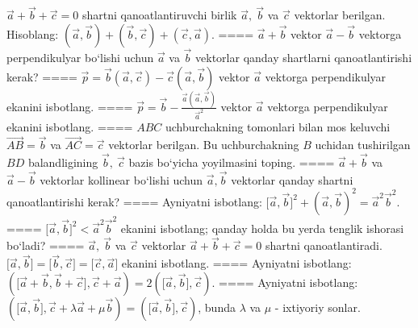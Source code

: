 \(\vec{a} + \vec{b} + \vec{c} = 0\) shartni qanoatlantiruvchi birlik \(\vec{a},\ \vec{b}\) va \(\vec{c}\) vektorlar berilgan. Hisoblang: \(\left(\vec{a},\vec{b} \right) + \left(\vec{b},\vec{c} \right) + \left(\vec{c},\vec{a} \right) \).
====
\(\vec{a} + \vec{b}\) vektor \(\vec{a} - \vec{b}\) vektorga perpendikulyar bo‘lishi uchun \(\vec{a}\) va \(\vec{b}\) vektorlar qanday shartlarni qanoatlantirishi kerak?
====
\(\vec{p} = \vec{b} (\vec{a},\vec{c}) - \vec{c} (\vec{a},\vec{b}) \) vektor \(\vec{a}\) vektorga perpendikulyar ekanini isbotlang.
====
\(\vec{p} = \vec{b} - \frac{\vec{a} (\vec{a},\vec{b}) }{{\vec{a}}^{2}}\) vektor \(\vec{a}\) vektorga perpendikulyar ekanini isbotlang.
====
\(ABC\) uchburchakning tomonlari bilan mos keluvchi \(\vec{AB} = \vec{b}\) va \(\vec{AC} = \vec{c}\) vektorlar berilgan. Bu uchburchakning \(B\) uchidan tushirilgan \(BD\) balandligining \(\vec{b},\ \vec{c}\) bazis bo‘yicha yoyilmasini toping.
====
\(\vec{a}+\vec{b}\) va \(\vec{a} - \vec{b}\) vektorlar kollinear bo‘lishi uchun \(\vec{a},\vec{b}\) vektorlar qanday shartni qanoatlantirishi kerak?
====
Ayniyatni isbotlang: \(\lbrack\vec{a},\vec{b}\rbrack^{2} + (\vec{a},\vec{b}) ^{2} = {\vec{a}}^{2}{\vec{b}}^{2}\).
====
\(\lbrack\vec{a},\vec{b}\rbrack^{2} < {\vec{a}}^{2}{\vec{b}}^{2}\) ekanini isbotlang; qanday holda bu yerda tenglik ishorasi bo‘ladi?
====
\(\vec{a},\ \vec{b}\) va \(\vec{c}\) vektorlar \(\vec{a} + \vec{b} + \vec{c} = 0\) shartni qanoatlantiradi. \(\lbrack\vec{a},\vec{b}\rbrack = \lbrack\vec{b},\vec{c}\rbrack = \lbrack\vec{c},\vec{a}\rbrack\) ekanini isbotlang.
====
Ayniyatni isbotlang: \((\lbrack\vec{a} + \vec{b},\vec{b} + \vec{c}\rbrack,\vec{c} + \vec{a}) = 2 (\lbrack\vec{a},\vec{b}\rbrack,\vec{c}) \).
====
Ayniyatni isbotlang: \((\lbrack\vec{a},\vec{b}\rbrack,\vec{c} + \lambda\vec{a} + \mu\vec{b}) = (\lbrack\vec{a},\vec{b}\rbrack,\vec{c}) \), bunda \(\lambda\) va \(\mu\) - ixtiyoriy sonlar.